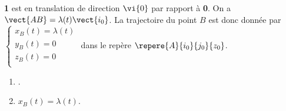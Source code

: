 \begin{corrigebox}
\textbf{1} est en translation de direction $\vi{0}$ par rapport à \textbf{0}.
On a $\vect{AB}=\lambda(t)\vect{i_0} $. La trajectoire du point $B$ est donc donnée par 
$\left\{ 
\begin{array}{l}
x_B(t) = \lambda (t) \\
y_B(t) = 0 \\
z_B(t) = 0 \\
\end{array}
\right.$ dans le repère $\repere{A}{i_0}{j_0}{z_0}$.

\begin{enumerate}
\item .
\item $x_B(t) = \lambda (t)$.
\end{enumerate}
\end{corrigebox}
